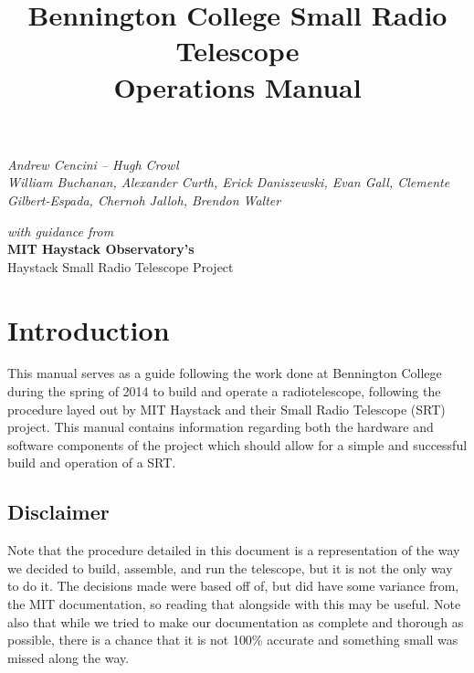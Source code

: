 \documentclass[11pt]{article} %
\title{\huge{Bennington College Small Radio Telescope} \\ Operations Manual}
\author{}
\date{} %
\begin{document}
\maketitle

\lstset{language=sh}

\vspace{4cm}

\begin{center}
\emph{\Large{Andrew Cencini – Hugh Crowl} \\ 
\large{William Buchanan, Alexander Curth, Erick Daniszewski, Evan Gall,
Clemente Gilbert-Espada, Chernoh Jalloh, Brendon Walter}}
\end{center}


\vspace{7cm}

\begin{center}
\emph{with guidance from} \\ 
\Large{\textbf{MIT Haystack Observatory's}} \\ 
Haystack Small Radio Telescope Project
\end{center}
\normalsize

\tableofcontents

\newpage

\section{Introduction}

This manual serves as a guide following the work done at Bennington College during the spring of 2014 to build and operate a radiotelescope, following the procedure layed out by MIT Haystack and their Small Radio Telescope (SRT) project. This manual contains information regarding both the hardware and software components of the project which should allow for a simple and successful build and operation of a SRT.

\subsection{Disclaimer}

Note that the procedure detailed in this document is a representation of the way we decided to build, assemble, and run the telescope, but it is not the only way to do it. The decisions made were based off of, but did have some variance from, the MIT documentation, so reading that alongside with this may be useful. Note also that while we tried to make our documentation as complete and thorough as possible, there is a chance that it is not 100\% accurate and something small was missed along the way. 
\end{document}
